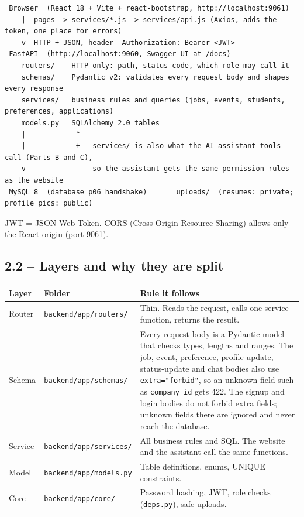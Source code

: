 \documentclass[11pt,letterpaper]{article}
\newcommand{\code}[1]{\texttt{#1}}
\begin{document}
\begin{lstlisting}
 Browser  (React 18 + Vite + react-bootstrap, http://localhost:9061)
    |  pages -> services/*.js -> services/api.js (Axios, adds the token, one place for errors)
    v  HTTP + JSON, header  Authorization: Bearer <JWT>
 FastAPI  (http://localhost:9060, Swagger UI at /docs)
    routers/    HTTP only: path, status code, which role may call it
    schemas/    Pydantic v2: validates every request body and shapes every response
    services/   business rules and queries (jobs, events, students, preferences, applications)
    models.py   SQLAlchemy 2.0 tables
    |            ^
    |            +-- services/ is also what the AI assistant tools call (Parts B and C),
    v                so the assistant gets the same permission rules as the website
 MySQL 8  (database p06_handshake)       uploads/  (resumes: private; profile_pics: public)
\end{lstlisting}

JWT = JSON Web Token. CORS (Cross-Origin Resource Sharing) allows only the React origin (port 9061).

\subsection*{2.2 -- Layers and why they are split}

{\small
\begin{longtable}{>{\raggedright\arraybackslash}p{}>{\raggedright\arraybackslash}p{}>{\raggedright\arraybackslash}p{}}
\hline
\textbf{Layer} & \textbf{Folder} & \textbf{Rule it follows} \\ \hline
\endhead
Router & \code{backend/\allowbreak{}app/\allowbreak{}routers/\allowbreak{}} & Thin. Reads the request, calls one service function, returns the result. \\ \hline
Schema & \code{backend/\allowbreak{}app/\allowbreak{}schemas/\allowbreak{}} & Every request body is a Pydantic model that checks types, lengths and ranges. The job, event, preference, profile-update, status-update and chat bodies also use \code{extra=\allowbreak{}"forbid"}, so an unknown field such as \code{company\_\allowbreak{}id} gets 422. The signup and login bodies do not forbid extra fields; unknown fields there are ignored and never reach the database. \\ \hline
Service & \code{backend/\allowbreak{}app/\allowbreak{}services/\allowbreak{}} & All business rules and SQL. The website and the assistant call the same functions. \\ \hline
Model & \code{backend/\allowbreak{}app/\allowbreak{}models.\allowbreak{}py} & Table definitions, enums, UNIQUE constraints. \\ \hline
Core & \code{backend/\allowbreak{}app/\allowbreak{}core/\allowbreak{}} & Password hashing, JWT, role checks (\code{deps.\allowbreak{}py}), safe uploads. \\ \hline
\end{longtable}
}
\end{document}
